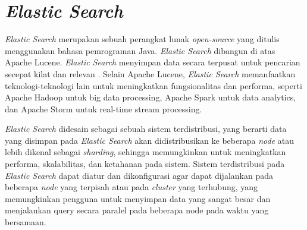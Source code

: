 \section{\textit{Elastic Search}}

\textit{Elastic Search} merupakan sebuah perangkat lunak \textit{open-source} yang ditulis menggunakan bahasa pemrograman Java. \textit{Elastic Search} dibangun di atas Apache Lucene. \textit{Elastic Search} menyimpan data secara terpusat untuk pencarian secepat kilat dan relevan \parencite{elasticsearchorigin}. Selain Apache Lucene, \textit{Elastic Search} memanfaatkan teknologi-teknologi lain untuk meningkatkan fungsionalitas dan performa, seperti Apache Hadoop untuk big data processing, Apache Spark untuk data analytics, dan Apache Storm untuk real-time stream processing.

\textit{Elastic Search} didesain sebagai sebuah sistem terdistribusi, yang berarti data yang disimpan pada \textit{Elastic Search} akan didistribusikan ke beberapa \textit{node} atau lebih dikenal sebagai \textit{sharding}, sehingga memungkinkan untuk meningkatkan performa, skalabilitas, dan ketahanan pada sistem. Sistem terdistribusi pada \textit{Elastic Search} dapat diatur dan dikonfigurasi agar dapat dijalankan pada beberapa \textit{node} yang terpisah atau pada \textit{cluster} yang terhubung, yang memungkinkan pengguna untuk menyimpan data yang sangat besar dan menjalankan query secara paralel pada beberapa node pada waktu yang bersamaan.

